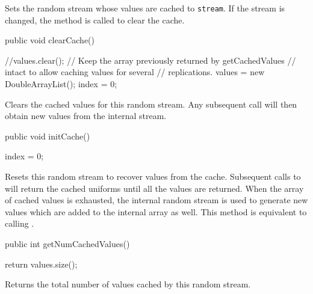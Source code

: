 \begin{tabb}   Sets the random stream whose values are cached to
 \texttt{stream}.  If the stream is changed, the 
 method is called to clear the cache.
\end{tabb}
\begin{htmlonly}
\end{htmlonly}
\begin{code}

   public void clearCache()\begin{hide} {
      //values.clear();
      // Keep the array previously returned by getCachedValues
      // intact to allow caching values for several
      // replications.
      values = new DoubleArrayList();
      index = 0;
   }\end{hide}
\end{code}
\begin{tabb}   Clears the cached values for this random stream.
 Any subsequent call will then obtain new values
 from the internal stream.
\end{tabb}
\begin{code}

   public void initCache()\begin{hide} {
      index = 0;
   }\end{hide}
\end{code}
\begin{tabb}   Resets this random stream to recover values from the cache.
 Subsequent calls
 to  will return the cached uniforms
 until all the values are returned.  When the array
 of cached values is exhausted, the internal random stream
 is used to generate new values which are added
 to the internal array as well.
 This method is equivalent to calling .
\end{tabb}
\begin{code}

   public int getNumCachedValues()\begin{hide} {
      return values.size();
   }\end{hide}
\end{code}
\begin{tabb}   Returns the total number of values cached by this random stream.
\end{tabb}
\begin{htmlonly}
\end{htmlonly}
